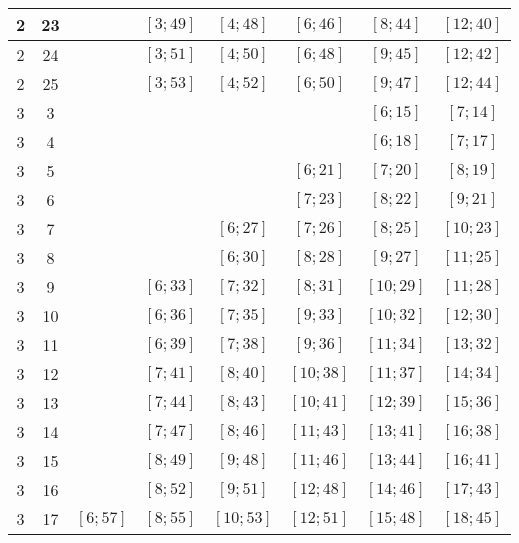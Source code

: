 \documentclass[a4paper,12pt]{article}
\begin{document}
\begin{center}
{\begin{longtable}[H]{|c|c|c|c|c|c|c|c|}
2 &  23 &   &  $\left[ 3; 49\right]$ &  $\left[ 4; 48\right]$ &  $\left[ 6; 46\right]$ &  $\left[ 8; 44\right]$ &  $\left[ 12; 40\right]$ \tabularnewline \hline
2 &  24 &   &  $\left[ 3; 51\right]$ &  $\left[ 4; 50\right]$ &  $\left[ 6; 48\right]$ &  $\left[ 9; 45\right]$ &  $\left[ 12; 42\right]$ \tabularnewline \hline
2 &  25 &   &  $\left[ 3; 53\right]$ &  $\left[ 4; 52\right]$ &  $\left[ 6; 50\right]$ &  $\left[ 9; 47\right]$ &  $\left[ 12; 44\right]$ \tabularnewline \hline
3 &  3 &   &   &   &   &  $\left[ 6; 15\right]$ &  $\left[ 7; 14\right]$ \tabularnewline \hline
3 &  4 &   &   &   &   &  $\left[ 6; 18\right]$ &  $\left[ 7; 17\right]$ \tabularnewline \hline
3 &  5 &   &   &   &  $\left[ 6; 21\right]$ &  $\left[ 7; 20\right]$ &  $\left[ 8; 19\right]$ \tabularnewline \hline
3 &  6 &   &   &   &  $\left[ 7; 23\right]$ &  $\left[ 8; 22\right]$ &  $\left[ 9; 21\right]$ \tabularnewline \hline
3 &  7 &   &   &  $\left[ 6; 27\right]$ &  $\left[ 7; 26\right]$ &  $\left[ 8; 25\right]$ &  $\left[ 10; 23\right]$ \tabularnewline \hline
3 &  8 &   &   &  $\left[ 6; 30\right]$ &  $\left[ 8; 28\right]$ &  $\left[ 9; 27\right]$ &  $\left[ 11; 25\right]$ \tabularnewline \hline
3 &  9 &   &  $\left[ 6; 33\right]$ &  $\left[ 7; 32\right]$ &  $\left[ 8; 31\right]$ &  $\left[ 10; 29\right]$ &  $\left[ 11; 28\right]$ \tabularnewline \hline
3 &  10 &   &  $\left[ 6; 36\right]$ &  $\left[ 7; 35\right]$ &  $\left[ 9; 33\right]$ &  $\left[ 10; 32\right]$ &  $\left[ 12; 30\right]$ \tabularnewline \hline
3 &  11 &   &  $\left[ 6; 39\right]$ &  $\left[ 7; 38\right]$ &  $\left[ 9; 36\right]$ &  $\left[ 11; 34\right]$ &  $\left[ 13; 32\right]$ \tabularnewline \hline
3 &  12 &   &  $\left[ 7; 41\right]$ &  $\left[ 8; 40\right]$ &  $\left[ 10; 38\right]$ &  $\left[ 11; 37\right]$ &  $\left[ 14; 34\right]$ \tabularnewline \hline
3 &  13 &   &  $\left[ 7; 44\right]$ &  $\left[ 8; 43\right]$ &  $\left[ 10; 41\right]$ &  $\left[ 12; 39\right]$ &  $\left[ 15; 36\right]$ \tabularnewline \hline
3 &  14 &   &  $\left[ 7; 47\right]$ &  $\left[ 8; 46\right]$ &  $\left[ 11; 43\right]$ &  $\left[ 13; 41\right]$ &  $\left[ 16; 38\right]$ \tabularnewline \hline
3 &  15 &   &  $\left[ 8; 49\right]$ &  $\left[ 9; 48\right]$ &  $\left[ 11; 46\right]$ &  $\left[ 13; 44\right]$ &  $\left[ 16; 41\right]$ \tabularnewline \hline
3 &  16 &   &  $\left[ 8; 52\right]$ &  $\left[ 9; 51\right]$ &  $\left[ 12; 48\right]$ &  $\left[ 14; 46\right]$ &  $\left[ 17; 43\right]$ \tabularnewline \hline
3 &  17 &  $\left[ 6; 57\right]$ &  $\left[ 8; 55\right]$ &  $\left[ 10; 53\right]$ &  $\left[ 12; 51\right]$ &  $\left[ 15; 48\right]$ &  $\left[ 18; 45\right]$ \tabularnewline \hline

\end{longtable}}
\end{center}
\end{document}
